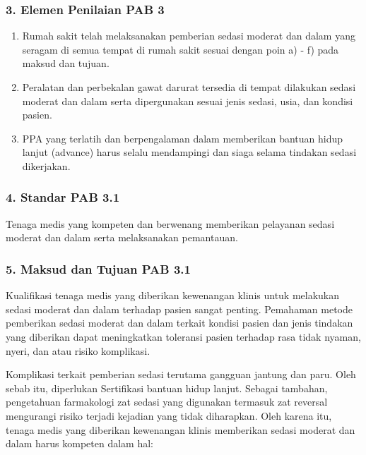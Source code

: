 \documentclass[
]{book}
\providecommand{\tightlist}{%
  \setlength{\itemsep}{0pt}\setlength{\parskip}{0pt}}
\begin{document}
\hypertarget{elemen-penilaian-pab-3}{%
\subsubsection*{3. Elemen Penilaian PAB 3}\label{elemen-penilaian-pab-3}}

\begin{enumerate}
\def\labelenumi{\alph{enumi}.}
\tightlist
\item
  Rumah sakit telah melaksanakan pemberian sedasi moderat dan dalam yang seragam di semua tempat di rumah sakit sesuai dengan poin a) - f) pada maksud dan tujuan.
\item
  Peralatan dan perbekalan gawat darurat tersedia di tempat dilakukan sedasi moderat dan dalam serta dipergunakan sesuai jenis sedasi, usia, dan kondisi pasien.
\item
  PPA yang terlatih dan berpengalaman dalam memberikan bantuan hidup lanjut (advance) harus selalu mendampingi dan siaga selama tindakan sedasi dikerjakan.
\end{enumerate}

\hypertarget{standar-pab-3.1}{%
\subsubsection*{4. Standar PAB 3.1}\label{standar-pab-3.1}}

Tenaga medis yang kompeten dan berwenang memberikan pelayanan sedasi moderat dan dalam serta melaksanakan pemantauan.

\hypertarget{maksud-dan-tujuan-pab-3.1}{%
\subsubsection*{5. Maksud dan Tujuan PAB 3.1}\label{maksud-dan-tujuan-pab-3.1}}

Kualifikasi tenaga medis yang diberikan kewenangan klinis untuk melakukan sedasi moderat dan dalam terhadap pasien sangat penting. Pemahaman metode pemberikan sedasi moderat dan dalam terkait kondisi pasien dan jenis tindakan yang diberikan dapat meningkatkan toleransi pasien terhadap rasa tidak nyaman, nyeri, dan atau risiko komplikasi.

Komplikasi terkait pemberian sedasi terutama gangguan jantung dan paru. Oleh sebab itu, diperlukan Sertifikasi bantuan hidup lanjut. Sebagai tambahan, pengetahuan farmakologi zat sedasi yang digunakan termasuk zat reversal mengurangi risiko terjadi kejadian yang tidak diharapkan. Oleh karena itu, tenaga medis yang diberikan kewenangan klinis memberikan sedasi moderat dan dalam harus kompeten dalam hal:
\end{document}
